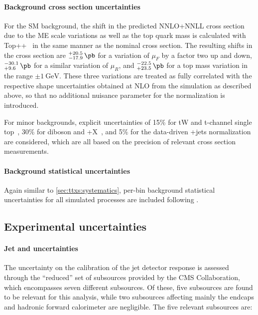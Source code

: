 \paragraph{Background cross section uncertainties}
For the SM \ttbar background, the shift in the predicted NNLO+NNLL \ttbar cross section due to the ME scale variations as well as the top quark mass is calculated with Top++~\cite{Czakon:2011xx} in the same manner as the nominal cross section. The resulting shifts in the cross section are ${}^{+20.5}_{-17.9}\,\si{\pb}$ for a variation of $\mu_F$ by a factor two up and down, ${}^{-30.1}_{+9.6}\,\si{\pb}$ for a similar variation of $\mu_R$, and ${}^{-22.5}_{+23.5}\,\si{\pb}$ for a top mass variation in the range $\pm \SI{1}{\GeV}$. These three variations are treated as fully correlated with the respective shape uncertainties obtained at NLO from the \powheg simulation as described above, so that no additional nuisance parameter for the \ttbar normalization is introduced.

For minor backgrounds, explicit uncertainties of 15\% for tW and t-channel single top~\cite{ATLAS:2016ymp,CMS:TOP-17-011,CMS:TOP-17-018}, 30\% for diboson and \ttbar+X~\cite{CMS:TOP-17-005,ATLAS:2019njj}, and 5\% for the data-driven \Zgamma+jets normalization~\cite{ATLAS:2016oxs} are considered, which are all based on the precision of relevant cross section measurements.

\paragraph{Background statistical uncertainties}
Again similar to \cref{sec:ttxs:systematics}, per-bin background statistical uncertainties for all simulated processes are included following .

\subsection{Experimental uncertainties}
\label{sec:ah:expsysts}

\paragraph{Jet and \ptmiss uncertainties}
The uncertainty on the calibration of the jet \pt detector response is assessed through the ``reduced'' set of subsources provided by the CMS Collaboration, which encompasses seven different subsources. Of these, five subsources are found to be relevant for this analysis, while two subsources affecting mainly the endcaps and hadronic forward calorimeter are negligible. The five relevant subsources are:

